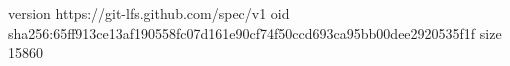 version https://git-lfs.github.com/spec/v1
oid sha256:65ff913ce13af190558fc07d161e90cf74f50ccd693ca95bb00dee2920535f1f
size 15860
